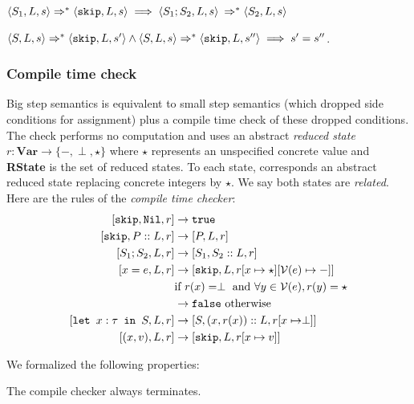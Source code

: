 \begin{proposition}[Sequentiality]
$\langle S_1, L, s \rangle \Rightarrow ^{*} \langle \texttt{skip}, L, s \rangle \implies \langle S_1;S_2, L, s \rangle$ $\Rightarrow ^{*} \langle S_2, L, s \rangle$
\end{proposition}

\begin{theorem}[Determinism]
$\langle S, L, s \rangle \Rightarrow ^{*} \langle \texttt{skip}, L, s' \rangle \land \langle S, L, s \rangle \Rightarrow ^{*} \langle \texttt{skip}, L, s'' \rangle \implies s' = s''$.
\end{theorem}

\subsubsection{Compile time check}

Big step semantics is equivalent to small step semantics (which dropped side conditions for assignment) plus a compile time check of these dropped conditions. The check performs no computation and uses an abstract \emph{reduced state} $r: \textbf{Var} \to \{-, \perp, \star \}$ where $\star$ represents an unspecified concrete value and \textbf{RState} is the set of reduced states. To each state, corresponds an abstract reduced state replacing concrete integers by $\star$. We say both states are \emph{related}. Here are the rules of the \emph{compile time checker}:
\begin{align*}
\cc{\texttt{skip}}{\texttt{Nil}}{r} & \to \texttt{true}  \\
\cc{\texttt{skip}} {P::L}{ r}       & \to \cc{P}{L}{r}  \\
\cc{S_1; S_2}{L}{r}                 & \to \cc{S_1}{S_2::L}{r}  \\
\cc{x=e}{L}{r}                     & \to \cc{\sk}{L}{r[x\mapsto \star][\mathcal{V}(e) \mapsto -]} \\
                                    & \textrm{if }r(x) = \perp \textrm{ and } \forall y \in \mathcal{V}(e), r(y) = \star \\
                                    & \to \texttt{false} \textrm{ otherwise}\\
\cc{\letm{x}{S}}{L}{r} & \to \cc{S}{(x,r(x))::L}{r[x\mapsto \perp]} \\
\cc{(x,v)}{L}{r}                    & \to \cc{\texttt{skip}}{L}{r[x \mapsto v]}
\end{align*}

We formalized the following properties:

\begin{theorem}[Termination]
The compile checker always terminates.
\end{theorem}

